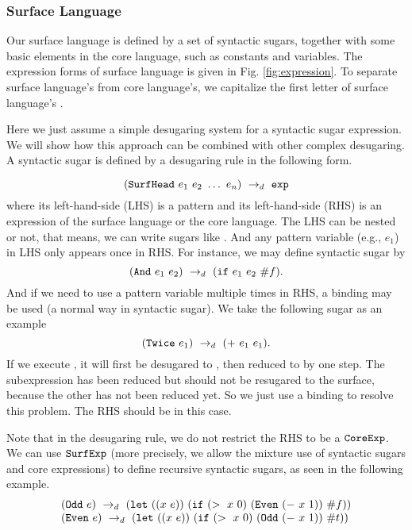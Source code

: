 
\subsubsection{Surface Language}

Our surface language is defined by a set of syntactic sugars, together with some basic elements in the core language, such as constants and variables. The expression forms of surface language is given in Fig.  \ref{fig:expression}. To separate surface language's  from core language's, we capitalize the first letter of surface language's .

Here we just assume a simple desugaring system for a syntactic sugar expression. We will show how this approach can be combined with other complex desugaring. A syntactic sugar is defined by a desugaring rule in the following form.

\[
(\mbox{\tt SurfHead}~e_1~e_2~\ldots~e_n) ~\rightarrow_d~ \mbox{\tt exp}
\]
where its left-hand-side (LHS) is a pattern and its left-hand-side (RHS) is an expression of the surface language or the core language. The LHS can be nested or not, that means, we can write sugars like . And any pattern variable (e.g., $e_1$) in LHS only appears once in RHS. For instance, we may define syntactic sugar  by
\[
(\mbox{\tt And}~e_1~e_2) ~\rightarrow_d~ (\mbox{\tt if}~e_1~e_2~\#f).
\]
And if we need to use a pattern variable multiple times in RHS, a  binding may be used (a normal way in syntactic sugar). We take the following sugar as an example
\[
(\mbox{\tt Twice}~e_1) ~\rightarrow_d~ (+~e_1~e_1).
\]
If we execute , it will first be desugared to , then reduced to  by one step. The subexpression  has been reduced but should not be resugared to the surface, because the other  has not been reduced yet.
So we just use a  binding to resolve this problem. The RHS should be  in this case.


Note that in the desugaring rule, we do not restrict the RHS to be a $\mbox{\tt CoreExp}$. We can use $\mbox{\tt SurfExp}$ (more precisely, we allow the mixture use of syntactic sugars and core expressions) to define recursive syntactic sugars, as seen in the following example.
\[
\begin{array}{l}
(\mbox{\tt Odd}~e) ~\rightarrow_d~ (\mbox{\tt let}~((x~e))~(\mbox{\tt if}~(>~x~0)~(\mbox{\tt Even}~(-~x~1))~\#f))\\
(\mbox{\tt Even}~e) ~\rightarrow_d~ (\mbox{\tt let}~((x~e))~(\mbox{\tt if}~(>~x~0)~(\mbox{\tt Odd}~(-~x~1))~\#t))
\end{array}
\]

